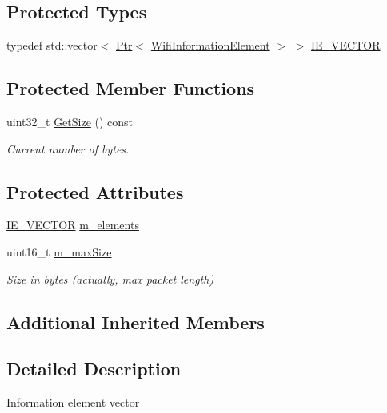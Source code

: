 \subsection*{Protected Types}
\begin{DoxyCompactItemize}
\item 
typedef std\+::vector$<$ \hyperlink{classns3_1_1Ptr}{Ptr}$<$ \hyperlink{classns3_1_1WifiInformationElement}{Wifi\+Information\+Element} $>$ $>$ \hyperlink{classns3_1_1WifiInformationElementVector_a948b975695a214bd58ba7f403b5afed7}{I\+E\+\_\+\+V\+E\+C\+T\+OR}
\end{DoxyCompactItemize}
\subsection*{Protected Member Functions}
\begin{DoxyCompactItemize}
\item 
uint32\+\_\+t \hyperlink{classns3_1_1WifiInformationElementVector_a4d02f4e99a4a83fb00b17becf39fe4ac}{Get\+Size} () const 
\begin{DoxyCompactList}\small\item\em Current number of bytes. \end{DoxyCompactList}\end{DoxyCompactItemize}
\subsection*{Protected Attributes}
\begin{DoxyCompactItemize}
\item 
\hyperlink{classns3_1_1WifiInformationElementVector_a948b975695a214bd58ba7f403b5afed7}{I\+E\+\_\+\+V\+E\+C\+T\+OR} \hyperlink{classns3_1_1WifiInformationElementVector_a03bf28a1640272cfa71fdd6e5bbf429e}{m\+\_\+elements}
\item 
uint16\+\_\+t \hyperlink{classns3_1_1WifiInformationElementVector_ae4e269048a74f706dc50155295dcd4ad}{m\+\_\+max\+Size}
\begin{DoxyCompactList}\small\item\em Size in bytes (actually, max packet length) \end{DoxyCompactList}\end{DoxyCompactItemize}
\subsection*{Additional Inherited Members}


\subsection{Detailed Description}
Information element vector

